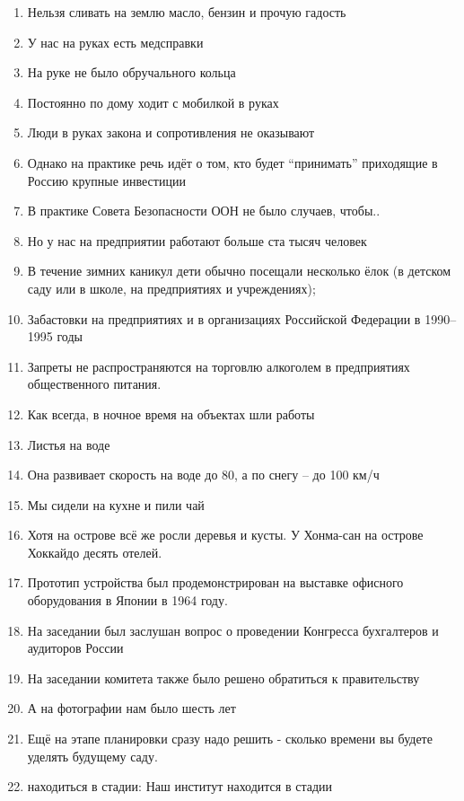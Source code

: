 \documentclass[]{scrartcl}
\providecommand{\tightlist}{%
  \setlength{\itemsep}{0pt}\setlength{\parskip}{0pt}}
\begin{document}
\begin{enumerate}
\def\labelenumi{(\arabic{enumi})}
\setcounter{enumi}{160}
\tightlist
\item
  Нельзя сливать на землю масло, бензин и прочую гадость
\item
  У нас на руках есть медсправки
\item
  На руке не было обручального кольца
\item
  Постоянно по дому ходит с мобилкой в руках
\item
  Люди в руках закона и сопротивления не оказывают
\item
  Однако на практике речь идёт о том, кто будет ``принимать'' приходящие
  в Россию крупные инвестиции
\item
  В практике Совета Безопасности ООН не было случаев, чтобы..
\item
  Но у нас на предприятии работают больше ста тысяч человек
\item
  В течение зимних каникул дети обычно посещали несколько ёлок (в
  детском саду или в школе, на предприятиях и учреждениях);
\item
  Забастовки на предприятиях и в организациях Российской Федерации в
  1990-- 1995 годы
\item
  Запреты не распространяются на торговлю алкоголем в предприятиях
  общественного питания.
\item
  Как всегда, в ночное время на объектах шли работы
\item
  Листья на воде
\item
  Она развивает скорость на воде до 80, а по снегу -- до 100 км/ч
\item
  Мы сидели на кухне и пили чай
\item
  Хотя на острове всё же росли деревья и кусты. У Хонма-сан на острове
  Хоккайдо десять отелей.
\item
  Прототип устройства был продемонстрирован на выставке офисного
  оборудования в Японии в 1964 году.
\item
  На заседании был заслушан вопрос о проведении Конгресса бухгалтеров и
  аудиторов России
\item
  На заседании комитета также было решено обратиться к правительству
\item
  А на фотографии нам было шесть лет
\item
  Ещё на этапе планировки сразу надо решить - сколько времени вы будете
  уделять будущему саду.
\item
  находиться в стадии: Наш институт находится в стадии

\end{enumerate}
\end{document}

